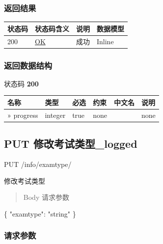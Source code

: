 \documentclass[
]{article}
\newenvironment{Shaded}{}{}
\newcommand{\DataTypeTok}[1]{\textcolor[rgb]{0.56,0.13,0.00}{#1}}
\newcommand{\FunctionTok}[1]{\textcolor[rgb]{0.02,0.16,0.49}{#1}}
\newcommand{\StringTok}[1]{\textcolor[rgb]{0.25,0.44,0.63}{#1}}
\begin{document}
\hypertarget{ux8fd4ux56deux7ed3ux679c-37}{%
\subsubsection{返回结果}\label{ux8fd4ux56deux7ed3ux679c-37}}

\begin{longtable}[]{@{}llll@{}}
\toprule
状态码 & 状态码含义 & 说明 & 数据模型 \\
\midrule
\endhead
200 & \href{https://tools.ietf.org/html/rfc7231\#section-6.3.1}{OK} &
成功 & Inline \\
\bottomrule
\end{longtable}

\hypertarget{ux8fd4ux56deux6570ux636eux7ed3ux6784-29}{%
\subsubsection{返回数据结构}\label{ux8fd4ux56deux6570ux636eux7ed3ux6784-29}}

状态码 \textbf{200}

\begin{longtable}[]{@{}llllll@{}}
\toprule
名称 & 类型 & 必选 & 约束 & 中文名 & 说明 \\
\midrule
\endhead
» progress & integer & true & none & & none \\
\bottomrule
\end{longtable}

\hypertarget{put-ux4feeux6539ux8003ux8bd5ux7c7bux578blogged}{%
\subsection{PUT
修改考试类型\_logged}\label{put-ux4feeux6539ux8003ux8bd5ux7c7bux578blogged}}

PUT /info/examtype/

修改考试类型

\begin{quote}
Body 请求参数
\end{quote}

\begin{Shaded}
\begin{Highlighting}[]
\FunctionTok{\{}
  \DataTypeTok{"examtype"}\FunctionTok{:} \StringTok{"string"}
\FunctionTok{\}}
\end{Highlighting}
\end{Shaded}

\hypertarget{ux8bf7ux6c42ux53c2ux6570-36}{%
\subsubsection{请求参数}\label{ux8bf7ux6c42ux53c2ux6570-36}}
\end{document}
